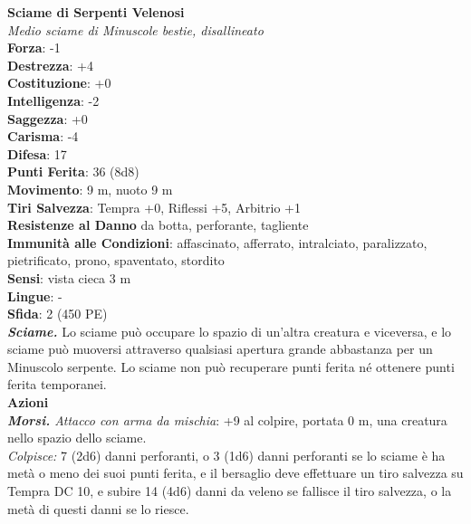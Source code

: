 \begin{multicols}{2}
\medskip\textbf{Sciame di Serpenti Velenosi}\\
\emph{Medio sciame di Minuscole bestie, disallineato}\\
\textbf{Forza}: -1\\
\textbf{Destrezza}: +4\\
\textbf{Costituzione}: +0\\
\textbf{Intelligenza}: -2\\
\textbf{Saggezza}: +0\\
\textbf{Carisma}: -4\\
\textbf{Difesa}: 17\\
\textbf{Punti Ferita}: 36 (8d8)\\
\textbf{Movimento}: 9 m, nuoto 9 m\\
\textbf{Tiri Salvezza}: Tempra +0, Riflessi +5, Arbitrio +1\\
\textbf{Resistenze al Danno} da botta, perforante, tagliente\\
\textbf{Immunità alle Condizioni}: affascinato, afferrato, intralciato, paralizzato, pietrificato, prono, spaventato, stordito\\
\textbf{Sensi}: vista cieca 3 m\\
\textbf{Lingue}: -\\
\textbf{Sfida}: 2 (450 PE)\smallskip\\
\emph{\textbf{Sciame.}} Lo sciame può occupare lo spazio di un'altra creatura e viceversa, e lo sciame può muoversi attraverso qualsiasi apertura grande abbastanza per un Minuscolo serpente. Lo sciame non può recuperare punti ferita né ottenere punti ferita temporanei.\\
\smallskip\textbf{Azioni}\\
\emph{\textbf{Morsi.} Attacco con arma da mischia}: +9 al colpire, portata 0 m, una creatura nello spazio dello sciame.\\
\emph{Colpisce:} 7 (2d6) danni perforanti, o 3 (1d6) danni perforanti se lo sciame è ha metà o meno dei suoi punti ferita, e il bersaglio deve effettuare un tiro salvezza su Tempra DC 10, e subire 14 (4d6) danni da veleno se fallisce il tiro salvezza, o la metà di questi danni se lo riesce.\\


\end{multicols}
